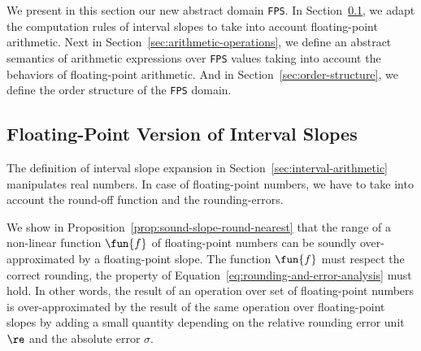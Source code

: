 We present in this section our new abstract domain \texttt{FPS}. In
Section~\ref{sec:floating-point-version-of-interval-slopes}, we adapt
the computation rules of interval slopes to take into account
floating-point arithmetic. Next in
Section~\ref{sec:arithmetic-operations}, we define an abstract
semantics of arithmetic expressions over \texttt{FPS} values taking
into account the behaviors of floating-point arithmetic. And in
Section~\ref{sec:order-structure}, we define the order structure of
the \texttt{FPS} domain.

\subsection{Floating-Point Version of Interval Slopes}
\label{sec:floating-point-version-of-interval-slopes}

The definition of interval slope expansion in
Section~\ref{sec:interval-arithmetic} manipulates real numbers. In
case of floating-point numbers, we have to take into account the
round-off function and the rounding-errors.

We show in Proposition~\ref{prop:sound-slope-round-nearest} that the
range of a non-linear function $\fun{f}$ of floating-point numbers can
be soundly over-approximated by a floating-point slope. The function
$\fun{f}$ must respect the correct rounding, \ie the property of
Equation~\eqref{eq:rounding-and-error-analysis} must hold. In other
words, the result of an operation over set of floating-point numbers
is over-approximated by the result of the same operation over
floating-point slopes by adding a small quantity depending on the
relative rounding error unit $\re$ and the absolute error $\sigma$.


